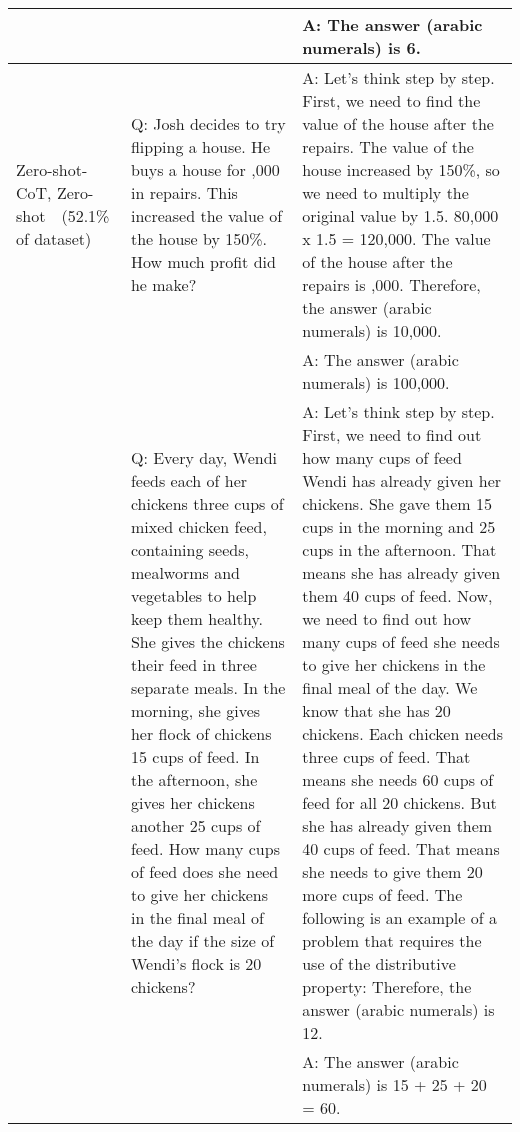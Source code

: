 \documentclass{article}
\newcommand{\ours}{Zero-shot-CoT\xspace}
\newcommand{\theirsz}{Zero-shot\xspace}
\newcommand{\okmark}{{\textbf{\textcolor[rgb]{0.1, 0.5, 0.1}{}}}}
\newcommand{\ngmark}{{\textbf{\color{red}{\ding{55}}}}}
\newcommand{\bblue}[1]{{\textbf{\color{blue}{#1}}}}
\newcommand{\myspace}{}
\begin{document}
\begin{center}
\begin{longtable}{|p{}|p{}|p{}|}
\cmidrule(r){3-3}

& & A: The answer (arabic numerals) is 6. \okmark \\

\midrule

 \ours\ngmark, \theirsz~\ngmark~(52.1\% of dataset) & Q: Josh decides to try flipping a house.  He buys a house for \50,000 in repairs.  This increased the value of the house by 150\%.  How much profit did he make? & A: Let's think step by step. First, we need to find the value of the house after the repairs.  The value of the house increased by 150\%, so we need to multiply the original value by 1.5.  80,000 x 1.5 = 120,000.  The value of the house after the repairs is \10,000. Therefore, the answer (arabic numerals) is 10,000. \ngmark \myspace \bblue{(GT : 70000)}  \\

\cmidrule(r){3-3}

&& A: The answer (arabic numerals) is 100,000. \ngmark \myspace \bblue{(GT : 70000)} \\

\cmidrule(r){2-3}

& Q: Every day, Wendi feeds each of her chickens three cups of mixed chicken feed, containing seeds, mealworms and vegetables to help keep them healthy.  She gives the chickens their feed in three separate meals. In the morning, she gives her flock of chickens 15 cups of feed.  In the afternoon, she gives her chickens another 25 cups of feed.  How many cups of feed does she need to give her chickens in the final meal of the day if the size of Wendi's flock is 20 chickens? & A: Let's think step by step. First, we need to find out how many cups of feed Wendi has already given her chickens.  She gave them 15 cups in the morning and 25 cups in the afternoon.  That means she has already given them 40 cups of feed.  Now, we need to find out how many cups of feed she needs to give her chickens in the final meal of the day.  We know that she has 20 chickens.  Each chicken needs three cups of feed.  That means she needs 60 cups of feed for all 20 chickens.  But she has already given them 40 cups of feed.  That means she needs to give them 20 more cups of feed. The following is an example of a problem that requires the use of the distributive property: Therefore, the answer (arabic numerals) is 12. \ngmark \myspace \bblue{(GT : 20)} \\

\cmidrule(r){3-3}

& & A: The answer (arabic numerals) is 15 + 25 + 20 = 60.  \ngmark \myspace \bblue{(GT : 20)}

\end{longtable}
\end{center} 
\clearpage
\end{document}
